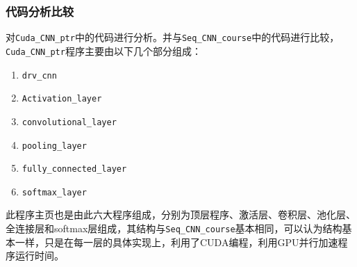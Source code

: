 \subsubsection{代码分析比较}

对\colorbox[gray]{0.9}{\texttt{Cuda\_CNN\_ptr}}中的代码进行分析。并与\colorbox[gray]{0.9}{\texttt{Seq\_CNN\_course}}中的代码进行比较，\colorbox[gray]{0.9}{\texttt{Cuda\_CNN\_ptr}}程序主要由以下几个部分组成：

\begin{enumerate}
    \item \colorbox[gray]{0.9}{\texttt{drv\_cnn}}
    \item \colorbox[gray]{0.9}{\texttt{Activation\_layer}}
    \item \colorbox[gray]{0.9}{\texttt{convolutional\_layer}}
    \item \colorbox[gray]{0.9}{\texttt{pooling\_layer}}
    \item \colorbox[gray]{0.9}{\texttt{fully\_connected\_layer}}
    \item \colorbox[gray]{0.9}{\texttt{softmax\_layer}}
\end{enumerate}

此程序主页也是由此六大程序组成，分别为顶层程序、激活层、卷积层、池化层、全连接层和softmax层组成，其结构与\colorbox[gray]{0.9}{\texttt{Seq\_CNN\_course}}基本相同，可以认为结构基本一样，只是在每一层的具体实现上，利用了CUDA编程，利用GPU并行加速程序运行时间。
